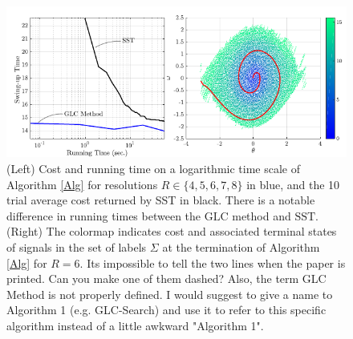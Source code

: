 \documentclass{llncs}
\newcommand{\GLC}{\ensuremath{\mathrm{GLC}}\xspace}
\newcommand{\SST}{\ensuremath{\mathrm{SST}}\xspace}
\begin{document}
%
\begin{figure}
\centering{}\includegraphics[width=1\textwidth]{Graphics/Pendulum_Example/pendulum}\caption{\label{fig:pendulum} (Left) Cost and running time on a logarithmic time scale of Algorithm \ref{Alg} for resolutions $R\in\{4,5,6,7,8\}$ in blue, and the 10 trial average cost returned by SST in black. There is a notable difference in running times between the \GLC method and \SST. (Right) The colormap indicates cost and associated terminal states of signals in the set of labels $\Sigma$ at the termination of Algorithm \ref{Alg} for $R=6$. {\color{red} Its impossible to tell the two lines when the paper is printed. Can you make one of them dashed? Also, the term GLC Method is not properly defined. I would suggest to give a name to Algorithm 1 (e.g. GLC-Search) and use it to refer to this specific algorithm instead of a little awkward "Algorithm 1".}}
\end{figure}
\end{document}
